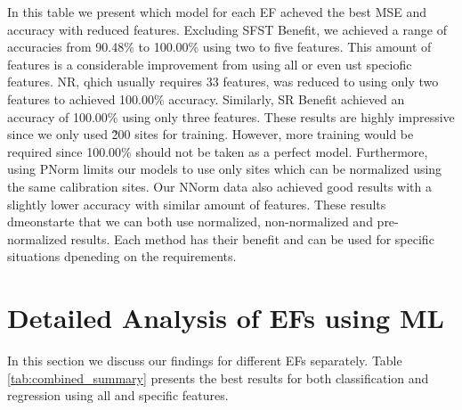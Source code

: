 \documentclass[12pt,letterpaper]{article}
\begin{document}
In this table we present which model for each \ac{EF} acheved the best MSE and accuracy with reduced features.
Excluding \ac{SFST} Benefit, we achieved a range of accuracies from 90.48\% to 100.00\% using two to five features.
This amount of features is a considerable improvement from using all or even ust speciofic features.
\ac{NR}, qhich usually requires 33 features, was reduced to using only two features to achieved 100.00\% accuracy.
Similarly, \ac{SR} Benefit achieved an accuracy of 100.00\% using only three features.
These results are highly impressive since we only used \~ 200 sites for training.
However, more training would be required since 100.00\% should not be taken as a perfect model.
Furthermore, using PNorm limits our models to use only sites which can be normalized using the same calibration sites.
Our NNorm data also achieved good results with a slightly lower accuracy with similar amount of features.
These results dmeonstarte that we can both use normalized, non-normalized and pre-normalized results.
Each method has their benefit and can be used for specific situations dpeneding on the requirements.






\clearpage





\section{Detailed Analysis of \ac{EF}s using \ac{ML}}
In this section we discuss our findings for different \ac{EF}s separately.
Table \ref{tab:combined_summary} presents the best results for both classification and regression using all and specific features. 
\end{document}
